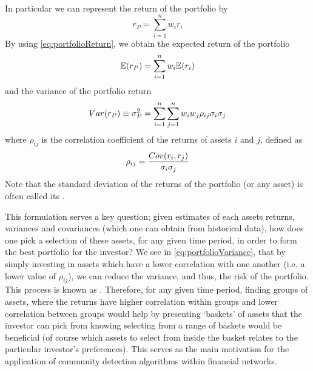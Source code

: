 In particular we can represent the return of the portfolio by
\begin{equation}
	\label{eq:portfolioReturn}
	r_{P} = \sum_{i=1}^{n} w_{i} r_{i}
\end{equation}
By using \cref{eq:portfolioReturn}, we obtain the expected return of the portfolio
\begin{equation}
	\label{eq:portfolioExpectedReturn}
	\mathbb{E}(r_{P}) = \sum_{i=1}^{n} w_{i} \mathbb{E}(r_{i})
\end{equation}
and the variance of the portfolio return
\begin{equation}
	\label{eq:portfolioVariance}
	Var(r_{P}) \equiv \sigma^{2}_{P}  = \sum_{i=1}^{n} \sum_{j=1}^{n} w_{i} w_{j} \rho_{ij} \sigma_{i} \sigma_{j}
\end{equation}
where $\rho_{ij}$ is the correlation coefficient of the returns of assets $i$ and $j$, defined as
\begin{equation}
	\label{eq:correlationCoefficient}
	\rho_{ij} = \frac{\covariance{r_{i},r_{j}}}{\sigma_{i} \sigma_{j}}
\end{equation}
Note that the standard deviation of the returns of the portfolio (or any asset) is often called its .

This formulation serves a key question; given estimates of each assets returns, variances and covariances (which one can obtain from historical data), how does one pick a selection of these assets, for any given time period, in order to form the best portfolio for the investor?
We see in \cref{eq:portfolioVariance}, that by simply investing in assets which have a lower correlation with one another (i.e. a lower value of $\rho_{ij}$), we can reduce the variance, and thus, the risk of the portfolio.
This process is known as  \cite{Lue98,BKM13}.
Therefore, for any given time period, finding groups of assets, where the returns have higher correlation within groups and lower correlation between groups would help by presenting `baskets' of assets that the investor can pick from knowing selecting from a range of baskets would be beneficial (of course which assets to select from inside the basket relates to the particular investor's preferences).
This serves as the main motivation for the application of community detection algorithms within financial networks.



